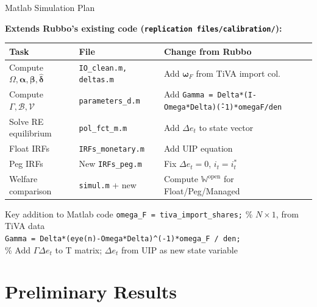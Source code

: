 \documentclass[aspectratio=169]{beamer}
\begin{document}
\begin{frame}{Matlab Simulation Plan}

\textbf{Extends Rubbo's existing code (\texttt{replication files/calibration/}):}

\begin{center}
\small
\begin{tabular}{lll}
\toprule
\textbf{Task} & \textbf{File} & \textbf{Change from Rubbo} \\
\midrule
Compute $\Omega, \bm{\alpha}, \bm{\beta}, \hat{\bm{\delta}}$ & \texttt{IO\_clean.m, deltas.m} & Add $\bm{\omega}_F$ from TiVA import col. \\
Compute $\Gamma, \mathcal{B}, \mathcal{V}$ & \texttt{parameters\_d.m} & Add \texttt{Gamma = Delta*(I-Omega*Delta)\^(-1)*omegaF/den} \\
Solve RE equilibrium & \texttt{pol\_fct\_m.m} & Add $\Delta e_t$ to state vector \\
Float IRFs & \texttt{IRFs\_monetary.m} & Add UIP equation \\
Peg IRFs & New \texttt{IRFs\_peg.m} & Fix $\Delta e_t = 0$, $i_t = i_t^*$ \\
Welfare comparison & \texttt{simul.m} + new & Compute $\mathbb{W}^{\text{open}}$ for Float/Peg/Managed \\
\bottomrule
\end{tabular}
\end{center}

\vspace{0.2cm}
\begin{exampleblock}{Key addition to Matlab code}
\texttt{omega\_F = tiva\_import\_shares;} \quad \% $N\times 1$, from TiVA data\\
\texttt{Gamma = Delta*(eye(n)-Omega*Delta)\^{}(-1)*omega\_F / den;}\\
\% Add $\Gamma\Delta e_t$ to T matrix; $\Delta e_t$ from UIP as new state variable
\end{exampleblock}
\end{frame}

\section{Preliminary Results}
\end{document}
